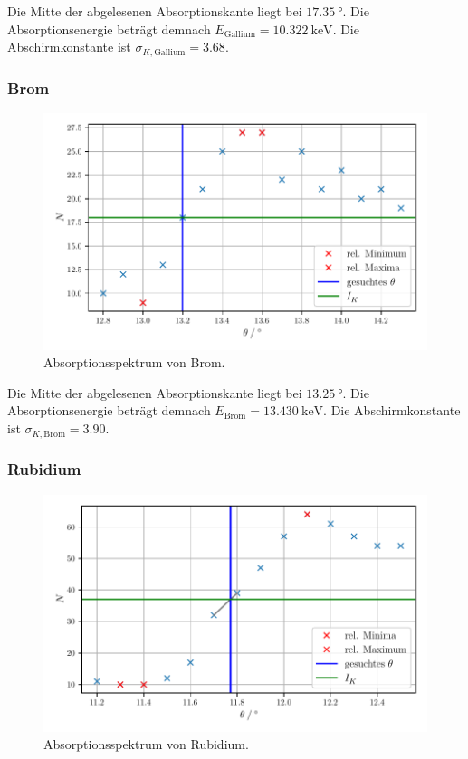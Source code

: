 Die Mitte der abgelesenen Absorptionskante liegt bei $\SI{17.35}{\degree}$.
Die Absorptionsenergie beträgt demnach $E_\text{Gallium} = \SI{10.322}{\kilo\electronvolt}$.
Die Abschirmkonstante ist $\sigma_{K, \text{Gallium}} = \num{3.68}$.

\subsubsection{Brom}

\begin{figure}[H]
    \centering
    \includegraphics[width=\textwidth]{build/plot_brom.pdf}
    \caption{Absorptionsspektrum von Brom.}
    \label{fig:brom}
\end{figure}

Die Mitte der abgelesenen Absorptionskante liegt bei $\SI{13.25}{\degree}$.
Die Absorptionsenergie beträgt demnach $E_\text{Brom} = \SI{13.430}{\kilo\electronvolt}$.
Die Abschirmkonstante ist $\sigma_{K, \text{Brom}} = \num{3.90}$.

\subsubsection{Rubidium}

\begin{figure}[H]
    \centering
    \includegraphics[width=\textwidth]{build/plot_rubidium.pdf}
    \caption{Absorptionsspektrum von Rubidium.}
    \label{fig:rubidium}
\end{figure}

